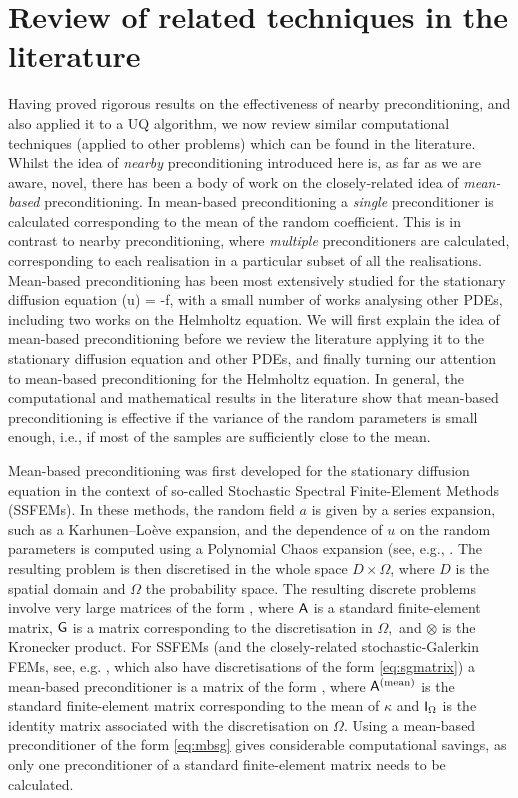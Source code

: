 \section{Review of related techniques in the literature}\label{sec:nbpclitreview}
   
Having proved rigorous results on the effectiveness of nearby preconditioning, and also applied it to a UQ algorithm, we now review similar computational techniques (applied to other problems) which can be found in the literature. Whilst the idea of \emph{nearby} preconditioning introduced here is, as far as we are aware, novel, there has been a body of work on the closely-related idea of \emph{mean-based} preconditioning. In mean-based preconditioning a \emph{single} preconditioner is calculated corresponding to the mean of the random coefficient. This is in contrast to nearby preconditioning, where \emph{multiple} preconditioners are calculated, corresponding to each realisation in a particular subset of all the realisations. Mean-based preconditioning has been most extensively studied for the stationary diffusion equation
    \beqs
\grad \cdot \mleft(\kappa\grad u\mright)  = -f,
\eeqs
with a small number of works analysing other PDEs, including two works on the Helmholtz equation. We will first explain the idea of mean-based preconditioning before we review the literature applying it to the stationary diffusion equation and other PDEs, and finally turning our attention to mean-based preconditioning for the Helmholtz equation. In general, the computational and mathematical results in the literature show that mean-based preconditioning  is effective if the variance of the random parameters is small enough, i.e.,  if most of the samples are sufficiently close to the mean.

Mean-based preconditioning was first developed for the stationary diffusion equation in the context of so-called Stochastic Spectral Finite-Element Methods (SSFEMs). In these methods, the random field $a$ is given by a series expansion, such as a Karhunen--Lo\`eve expansion, and the dependence of $u$ on the random parameters is computed using a Polynomial Chaos expansion (see, e.g., \cite[Section 2.4.2]{GhSp:12}. The resulting problem is then discretised in the whole space $D \times \Omega$, where $D$ is the spatial domain and $\Omega$ the probability space. The resulting discrete problems involve very large matrices of the form
\beq\label{eq:sgmatrix}
\Amat \otimes \Gmat,
\eeq
where $\mathsf{A}$ is a standard finite-element matrix, $\mathsf{G}$ is a matrix corresponding to the discretisation in $\Omega,$ and $\otimes$ is the Kronecker product. For SSFEMs (and the closely-related stochastic-Galerkin FEMs, see, e.g. \cite{BaTeZo:04}, which also have discretisations of the form \cref{eq:sgmatrix}) a mean-based preconditioner is a matrix of the form
\beq\label{eq:mbsg}
\Amatmean \otimes \ImatOmega,
\eeq
where $\mathsf{A}^{(\mathrm{mean})}$ is the standard finite-element matrix corresponding to the mean of $\kappa$ and $\mathsf{I}_{\Omega}$ is the identity matrix associated with the discretisation on $\Omega.$ Using a mean-based preconditioner of the form \cref{eq:mbsg} gives considerable computational savings, as only one preconditioner of a standard finite-element matrix needs to be calculated.

